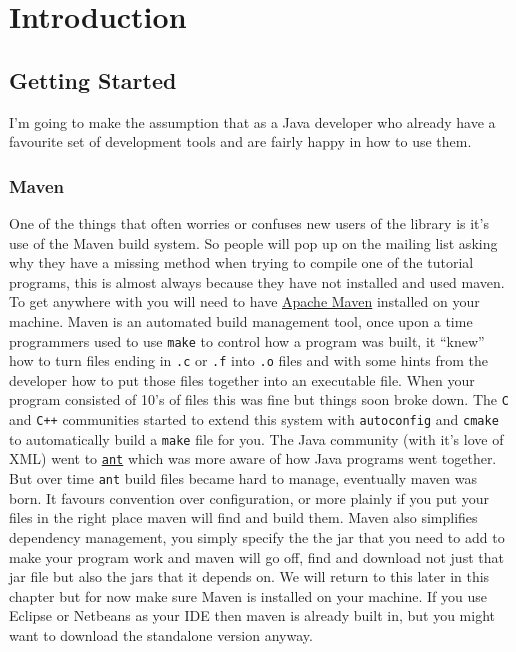 \chapter{Introduction}\label{introduction}

\section{Getting Started}
I'm going to make the assumption that as a Java developer who already have a favourite set of development tools and are fairly happy in how to use them. 

\subsection{Maven}
One of the things that often worries or confuses new users of the \GeoTools library is it's use of the Maven build system. So people will pop up on the mailing list asking why they have a missing method when trying to compile one of the tutorial programs, this is almost always because they have not installed and used maven.
To get anywhere with \GeoTools you will need to have \href{http://maven.apache.org/}{Apache Maven} installed on your machine. Maven is an automated build management tool, once upon a time programmers used to use \texttt{make} to control how a program was built, it ``knew'' how to turn files ending in \texttt{.c} or \texttt{.f} into \texttt{.o} files and with some hints from the developer how to put those files together into an executable file. When your program consisted of 10's of files this was fine but things soon broke down. The \texttt{C} and \texttt{C++} communities started to extend this system with \texttt{autoconfig} and \texttt{cmake} to automatically build a \texttt{make} file for you. The Java community (with it's love of XML) went to \href{http://ant.apache.org/}{\texttt{ant}} which was more aware of how Java programs went together. But over time \texttt{ant} build files became hard to manage, eventually maven was born. It favours convention over configuration, or more plainly if you put your files in the right place maven will find and build them. Maven also simplifies dependency management, you simply specify the the jar that you need to add to make your program work and maven will go off, find and download not just that jar file but also the jars that it depends on. We will return to this later in this chapter but for now make sure Maven is installed on your machine. If you use Eclipse or Netbeans as your \ac{IDE} then maven is already built in, but you might want to download the standalone version anyway. 

